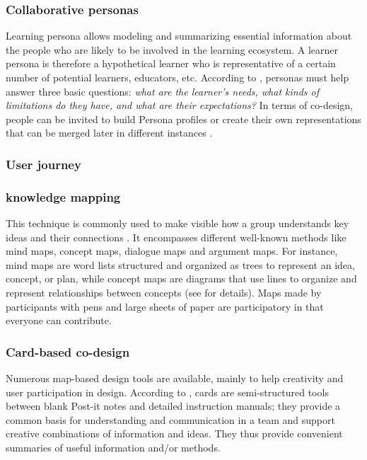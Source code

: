 \documentclass[preprint,12pt]{elsarticle}
\begin{document}
\subsubsection{Collaborative personas}
Learning persona allows modeling and summarizing essential information about the people who are likely to be involved in the learning ecosystem. A learner persona is therefore a hypothetical learner who is representative of a certain number of potential learners, educators, etc.
According to \citet{zhang2016data}, personas must help answer three basic questions: \textit{what are the learner’s needs, what kinds of limitations do they have, and what are their expectations?}
In terms of co-design, people can be invited to build Persona profiles or create their own representations that can be merged later in different instances \cite{prieto2018co}.

\subsubsection{User journey}

\subsubsection{knowledge mapping}
This technique is commonly used to make visible how a group understands key ideas and their connections \cite{prieto2018co}. It encompasses different well-known methods like  mind maps, concept
maps, dialogue maps and argument maps. For instance, mind maps are word lists structured and organized as trees to represent an idea, concept, or plan, while concept maps are diagrams that use lines to organize and represent relationships between concepts \cite{carrillo2017dashboard} (see \cite{okada2008knowledge} for details). Maps made by participants with pens and large sheets of paper are participatory in that everyone can contribute.

\subsubsection{Card-based co-design}
Numerous map-based design tools are available, mainly to help creativity and user participation in design. According to \citet{roy2019card}, cards are semi-structured tools between blank Post-it notes and detailed instruction manuals; they provide a common basis for understanding and communication in a team and support creative combinations of information and ideas. They thus  provide convenient summaries of useful information and/or methods.
\end{document}
